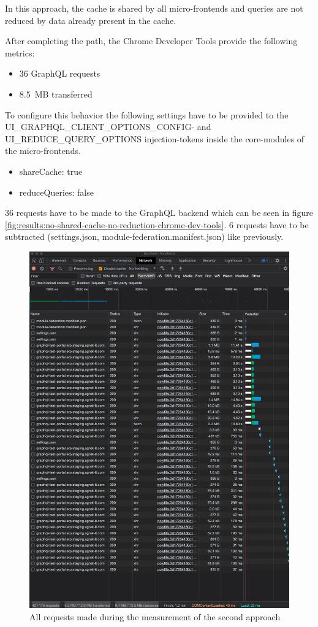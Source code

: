 In this approach, the cache is shared by all micro-frontends and queries are not reduced by data already present in the cache.

After completing the path, the Chrome Developer Tools provide the following metrics:

\begin{itemize}
    \item 36 GraphQL requests
    \item 8.5 MB transferred
\end{itemize}

 To configure this behavior the following settings have to be provided to the UI\_GRAPHQL\_CLIENT\_OPTIONS\_CONFIG- and UI\_REDUCE\_QUERY\_OPTIONS injection-tokens inside the core-modules of the micro-frontends.

\begin{itemize}
    \item shareCache: true
    \item reduceQueries: false
\end{itemize}

36 requests have to be made to the GraphQL backend which can be seen in figure \ref{fig:results:no-shared-cache-no-reduction-chrome-dev-tools}. 6 requests have to be subtracted (settings.json, module-federation.manifest.json) like previously.

\ifshowImages
\begin{figure}[H]
\centering
\includegraphics[width=0.6\linewidth]{images/1-attempt/shared-not-reduced-cache.png}
\caption{All requests made during the measurement of the second approach}\label{fig:results:shared-cache-no-reduction-chrome-dev-tools}
\end{figure}
\fi

